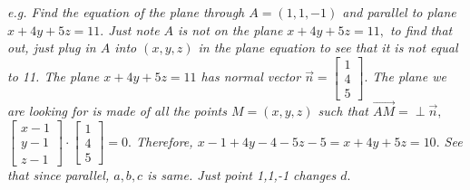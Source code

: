 \documentclass[addpoints]{exam}
\begin{document}
\textit{
e.g. Find the equation of the plane through $A=(1,1,-1)$ and parallel to plane $x+4y+5z=11.$ Just note $A$ is not on the plane $x+4y+5z=11,$ to find that out, just plug in $A$ into $(x,y,z)$ in the plane equation to see that it is not equal to 11. The plane $x+4y+5z=11$ has normal vector $\vec{n}=\begin{bmatrix}
    1\\4\\5
\end{bmatrix}.$ The plane we are looking for is made of all the points $M=(x,y,z)$ such that $\vec{AM}=\perp\vec{n},$ $\begin{bmatrix}
    x-1\\y-1\\z-1
\end{bmatrix}\cdot\begin{bmatrix}
    1\\4\\5
\end{bmatrix}=0.$ Therefore, $x-1+4y-4-5z-5=x+4y+5z=10.$ See that since parallel, $a,b,c$ is same. Just point 1,1,-1 changes $d.$
}
\end{document}

